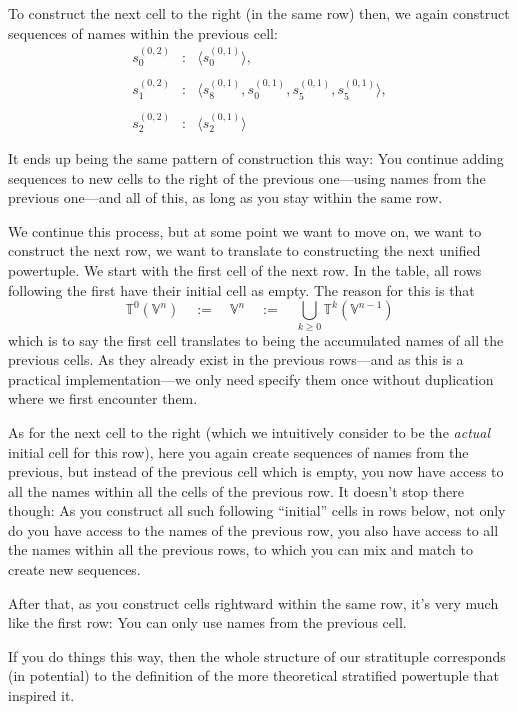 \documentclass[twoside]{article}
\newcommand{\nthpt}[2][T]{\ensuremath{\mathbb{#1}^{#2}}}
\newcommand{\nthut}[2][V]{\ensuremath{\mathbb{#1}^{#2}}}
\newcommand{\ptunion}[2][T]{\ensuremath{\bigcup_{#2\ge 0}\mathbb{#1}^{#2}}}
\newcommand{\sifter}[3]{\ensuremath{s^{(#1, #2)}_{#3}}}
\begin{document}
To construct the next cell to the right (in the same row) then, we again construct sequences
of names within the previous cell:
$$ \begin{array}{rcl}
\sifter{0}{2}{0} & : & \langle\sifter{0}{1}{0}\rangle,								\\
		        											\\
\sifter{0}{2}{1} & : & \langle\sifter{0}{1}{8}, \sifter{0}{1}{0}, \sifter{0}{1}{5}, \sifter{0}{1}{5}\rangle,	\\
		       												\\
\sifter{0}{2}{2} & : & \langle\sifter{0}{1}{2}\rangle
\end{array} $$

It ends up being the same pattern of construction this way: You continue adding sequences to new cells to the right
of the previous one---using names from the previous one---and all of this, as long as you stay within the same row.

We continue this process, but at some point we want to move on, we want to construct the next row, we
want to translate to constructing the next unified powertuple. We start with the first cell of the next row.
In the table, all rows following the first have their initial cell as empty. The reason for this is that
$$ \nthpt{0}(\nthut{n})\quad :=\quad\nthut{n}\quad :=\quad\ptunion{k}(\nthut{n-1}) $$
which is to say the first cell translates to being the accumulated names of all the previous cells.
As they already exist in the previous rows---and as this is a practical implementation---we only
need specify them once without duplication where we first encounter them.

As for the next cell to the right (which we intuitively consider to be the \emph{actual} initial cell for this row),
here you again create sequences of names from the previous, but instead of the previous cell which is empty,
you now have access to all the names within all the cells of the previous row. It doesn't stop there though:
As you construct all such following ``initial'' cells in rows below, not only do you have access to the names of the previous row,
you also have access to all the names within all the previous rows, to which you can mix and match to create new sequences.

After that, as you construct cells rightward within the same row, it's very much like the first row: You can only use
names from the previous cell.

If you do things this way, then the whole structure of our stratituple corresponds (in potential)
to the definition of the more theoretical stratified powertuple that inspired it.
\end{document}
